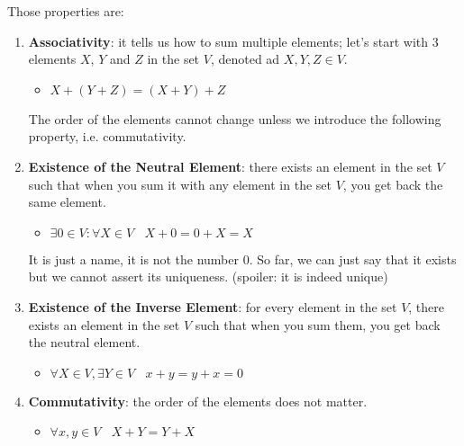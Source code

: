     Those properties are:
    \begin{enumerate}
        \item \textbf{Associativity}: it tells us how to sum multiple elements; let's start with 3 elements $X$, $Y$ and $Z$ in the set $V$, denoted ad $X,Y,Z \in V$.
            \begin{itemize}
                \item $X + (Y + Z) = (X + Y) + Z$
            \end{itemize}
            The order of the elements cannot change unless we introduce the following property, i.e. commutativity.
        \item \textbf{Existence of the Neutral Element}: there exists an element in the set $V$ such that when you sum it with any element in the set $V$, you get back the same element.
            \begin{itemize}
                \item $\exists 0 \in V: \forall X \in V \ \ \ \ X + 0 = 0 + X = X$
            \end{itemize}
            It is just a name, it is not the number 0. So far, we can just say that it exists but we cannot assert its uniqueness. (spoiler: it is indeed unique)
        \item \textbf{Existence of the Inverse Element}: for every element in the set $V$, there exists an element in the set $V$ such that when you sum them, you get back the neutral element.
            \begin{itemize}
                \item $\forall X \in V, \exists Y \in V \ \ \ \ x+y = y+x = 0$
            \end{itemize}
        \item \textbf{Commutativity}: the order of the elements does not matter.
            \begin{itemize}
                \item $\forall x,y \in V \ \ \ \  X + Y = Y + X$
            \end{itemize}
    \end{enumerate}





